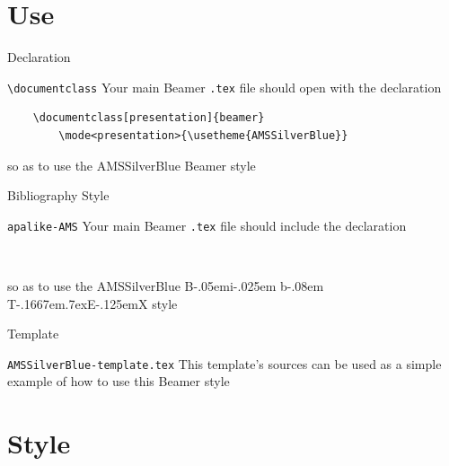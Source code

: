 \documentclass[presentation,cesena,apice]{beamer}\mode<presentation>{\usetheme{AMSSilverBlue}}
\def\BibTeX{{\rm B\kern-.05em{\sc i\kern-.025em b}\kern-.08em
    T\kern-.1667em\lower.7ex\hbox{E}\kern-.125emX}}
\begin{document}
\section{Use}

\begin{frame}[c,fragile]{Declaration}
%
\begin{block}{\texttt{\textbackslash{}documentclass}}
Your main Beamer \texttt{.tex} file should open with the declaration
%
\begin{verbatim}
    \documentclass[presentation]{beamer}
        \mode<presentation>{\usetheme{AMSSilverBlue}}
\end{verbatim}
%
so as to use the AMSSilverBlue Beamer style
\end{block}
%
\end{frame}

\begin{frame}[c,fragile]{Bibliography Style}
%
\begin{block}{\texttt{apalike-AMS}}
Your main Beamer \texttt{.tex} file should include the declaration
\begin{verbatim}
    
\end{verbatim}
so as to use the AMSSilverBlue \BibTeX{} style
\end{block}
%
\end{frame}

\begin{frame}[c,fragile]{Template}
%
\begin{block}{\texttt{AMSSilverBlue-template.tex}}
This template's sources can be used as a simple example of how to use this Beamer style
\end{block}
%
\end{frame}


\section{Style}
\end{document}
